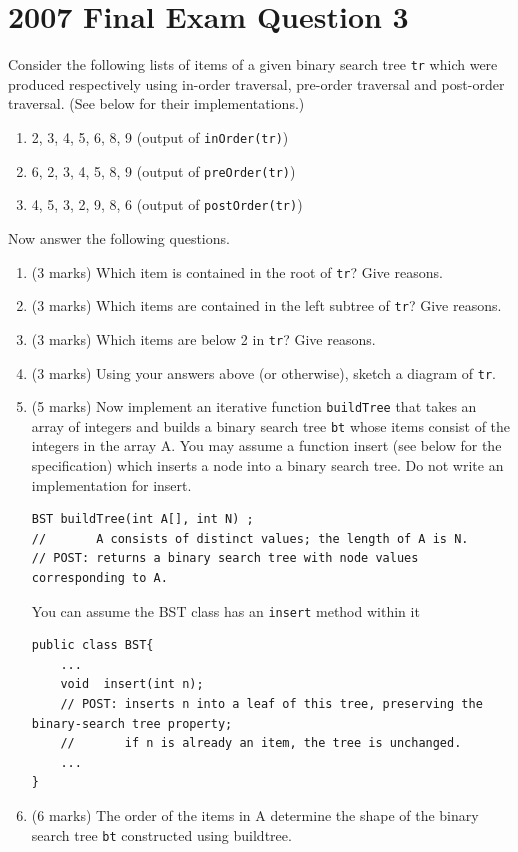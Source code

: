 \documentclass[twoside=false,DIV=14]{scrartcl}
\begin{document}
\section{2007 Final Exam Question 3}
Consider the following lists of items of a given binary search tree \verb+tr+ which were produced respectively using in-order traversal, pre-order traversal and post-order traversal. (See below for their implementations.)
\begin{enumerate}
\item 2, 3, 4, 5, 6, 8, 9 (output of \verb+inOrder(tr)+)
\item 6, 2, 3, 4, 5, 8, 9 (output of \verb+preOrder(tr)+)
\item 4, 5, 3, 2, 9, 8, 6 (output of \verb+postOrder(tr)+)
\end{enumerate}
Now answer the following questions.
\begin{enumerate}
\item (3 marks) Which item is contained in the root of \verb+tr+? Give reasons.
\item (3 marks) Which items are contained in the left subtree of \verb+tr+? Give reasons.
\item (3 marks) Which items are below 2 in \verb+tr+? Give reasons.
\item (3 marks) Using your answers above (or otherwise), sketch a diagram of \verb+tr+.
\item (5 marks) Now implement an iterative function \verb+buildTree+ that takes an array of integers and builds a binary search tree \verb+bt+ whose items consist of the integers in the array A. You may assume a function insert (see below for the specification) which inserts a node into a binary search tree. Do not write an implementation for insert.
\begin{lstlisting}
BST buildTree(int A[], int N) ;
//       A consists of distinct values; the length of A is N.
// POST: returns a binary search tree with node values corresponding to A.
\end{lstlisting}
You can assume the BST class has an \verb+insert+ method within it
\begin{lstlisting}
public class BST{
    ...
    void  insert(int n);
    // POST: inserts n into a leaf of this tree, preserving the binary-search tree property;
    //       if n is already an item, the tree is unchanged.
    ...
}
\end{lstlisting}
\item (6 marks) The order of the items in A determine the shape of the binary search tree \verb+bt+ constructed using buildtree.

\end{enumerate}
\end{document}
